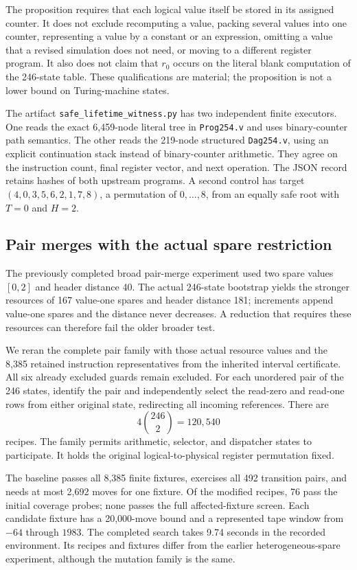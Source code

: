 The proposition requires that each logical value itself be stored in its
assigned counter. It does not exclude recomputing a value, packing several
values into one counter, representing a value by a constant or an expression,
omitting a value that a revised simulation does not need, or moving to a
different register program. It also does not claim that $r_0$ occurs on the
literal blank computation of the 246-state table. These qualifications are
material; the proposition is not a lower bound on Turing-machine states.

The artifact \texttt{safe\_lifetime\_witness.py} has two independent finite
executors. One reads the exact 6,459-node literal tree in \texttt{Prog254.v}
and uses binary-counter path semantics. The other reads the 219-node
structured \texttt{Dag254.v}, using an explicit continuation stack instead
of binary-counter arithmetic. They agree on the instruction count, final
register vector, and next operation. The JSON record retains hashes of both
upstream programs. A second control has target
$(4,0,3,5,6,2,1,7,8)$, a permutation of $0,\ldots,8$, from an equally safe
root with $T=0$ and $H=2$.

\subsection{Pair merges with the actual spare restriction}

The previously completed broad pair-merge experiment used two spare values
$[0,2]$ and header distance 40. The actual 246-state bootstrap yields the
stronger resources of 167 value-one spares and header distance 181; increments
append value-one spares and the distance never decreases. A reduction that
requires these resources can therefore fail the older broader test.

We reran the complete pair family with those actual resource values and the
8,385 retained instruction representatives from the inherited interval
certificate. All six already excluded guards remain excluded. For each
unordered pair of the 246 states, identify the pair and independently select
the read-zero and read-one rows from either original state, redirecting all
incoming references. There are
\[
  4\binom{246}{2}=120,540
\]
recipes. The family permits arithmetic, selector, and dispatcher states to
participate. It holds the original logical-to-physical register permutation
fixed.

The baseline passes all 8,385 finite fixtures, exercises all 492 transition
pairs, and needs at most 2,692 moves for one fixture. Of the modified recipes,
76 pass the initial coverage probes; none passes the full affected-fixture
screen. Each candidate fixture has a 20,000-move bound and a represented tape
window from $-64$ through $1983$. The completed search takes 9.74 seconds in
the recorded environment. Its recipes and fixtures differ from the earlier
heterogeneous-spare experiment, although the mutation family is the same.

